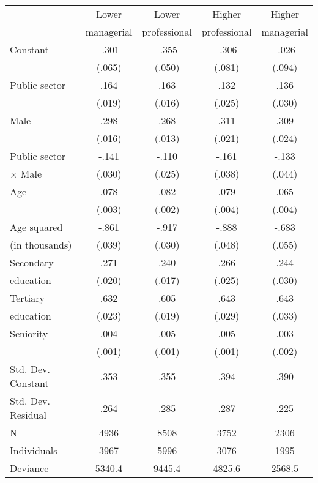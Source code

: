 \documentclass[a4paper,11pt,titlepage]{article}
\begin{document}
\begin{table}[t]
    \begin{tabularx}{\textwidth}{Ycccc}
    \toprule
			&Lower    & Lower &Higher &Higher \\
            & managerial & professional & professional & managerial \\
    \midrule
    Constant			&-.301	&-.355	&-.306	&-.026	   \\
    					&(.065)	&(.050)	&(.081)	&(.094)	    \\
    Public sector		&.164	&.163	&.132	& .136	\\
    					&(.019)	&(.016)	&(.025)	&(.030)	    \\
    Male				&.298	&.268	&.311	&.309	\\
    					&(.016)	&(.013)	&(.021)	&(.024)	\\
    Public sector		&-.141	&-.110	&-.161	&-.133	\\
    \quad $\times$ Male%
    					&(.030) &(.025)	&(.038)	&(.044)	\\
    Age					&.078	&.082	&.079	&.065	\\
    					&(.003)	&(.002)	&(.004)	&(.004)	\\
    Age squared			&-.861	&-.917	&-.888	&-.683	\\
    \quad (in thousands)%
    					&(.039) &(.030)	&(.048)	&(.055)	\\
    Secondary 			&.271	&.240	&.266	&.244	\\
    \quad education	    &(.020)	&(.017)	&(.025)	&(.030)	\\
    Tertiary			&.632	&.605	&.643	&.643	\\
    \quad education	    &(.023)	&(.019)	&(.029)	&(.033)	 \\
    Seniority			&.004	&.005	&.005	&.003	\\
    					&(.001)	&(.001)	&(.001)	&(.002)	\\
    \midrule
    Std. Dev. Constant  &.353   &.355	&.394	&.390	\\
    Std. Dev. Residual  &.264   &.285	&.287	&.225	\\
    N					&4936   &8508	&3752	&2306	\\
    Individuals			&3967   &5996	&3076	&1995	\\
    Deviance			&5340.4 &9445.4 &4825.6 &2568.5   \\
    \bottomrule
    \end{tabularx}
\end{table}
\end{document}
